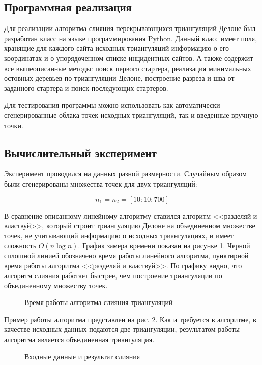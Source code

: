\documentclass[12pt]{article}
\begin{document}
\subsection{Программная реализация}
Для реализации алгоритма слияния перекрывающихся триангуляций Делоне был разработан класс
на языке программирования Python.
Данный класс имеет поля, хранящие для каждого сайта исходных триангуляций информацию о его координатах
и о упорядоченном списке инцидентных сайтов.
А также содержит все вышеописанные методы:
поиск первого стартера, реализация минимальных остовных деревьев по триангуляции Делоне,
построение разреза и шва от заданного стартера и поиск последующих стартеров.

Для тестирования программы можно использовать как автоматически сгенерированные облака точек исходных триангуляций,
так и введенные вручную точки.

\subsection{Вычислительный эксперимент}
Эксперимент проводился на данных разной размерности.
Случайным образом были сгенерированы множества точек для двух триангуляций:

$$n_1 = n_2 = [10 : 10 : 700]$$

В сравнение описанному линейному алгоритму ставился алгоритм <<разделяй и властвуй>>,
который строит триангуляцию Делоне на объединенном множестве точек,
не учитывающий информацию о исходных триангуляциях, и имеет сложность $O(n\log n)$.
График замера времени показан на рисунке \ref{pic:timeWork}.
Черной сплошной линией обозначено время работы линейного алгоритма,
пунктирной время работы алгоритма <<разделяй и властвуй>>.
По графику видно, что алгоритм слияния работает быстрее, чем построение триангуляции по объединенному множеству точек.

\begin{figure}[htb!]
	\caption{Время работы алгоритма слияния триангуляций}
	\label{pic:timeWork}
\end{figure}

Пример работы алгоритма представлен на рис. \ref{pic:exp_data}.
Как и требуется в алгоритме, в качестве исходных данных подаются две триангуляции,
результатом работы алгоритма является объединенная триангуляция.

\begin{figure}[htb!]
	\begin{minipage}[h]{1\linewidth}
	\end{minipage}
	\vfill
	\begin{minipage}[h]{1\linewidth}
	\end{minipage}
	\caption{Входные данные и результат слияния}
	\label{pic:exp_data}
\end{figure}
\end{document}
